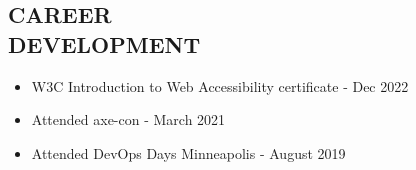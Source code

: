 \documentclass[margin]{res}
\begin{document}
\begin{resume}
\section{CAREER \\ DEVELOPMENT}
    \begin{itemize} \itemsep -2pt
        \item W3C Introduction to Web Accessibility certificate - Dec 2022
        \item Attended axe-con - March 2021
        \item Attended DevOps Days Minneapolis - August 2019
    \end{itemize}

\end{resume}
\end{document}
